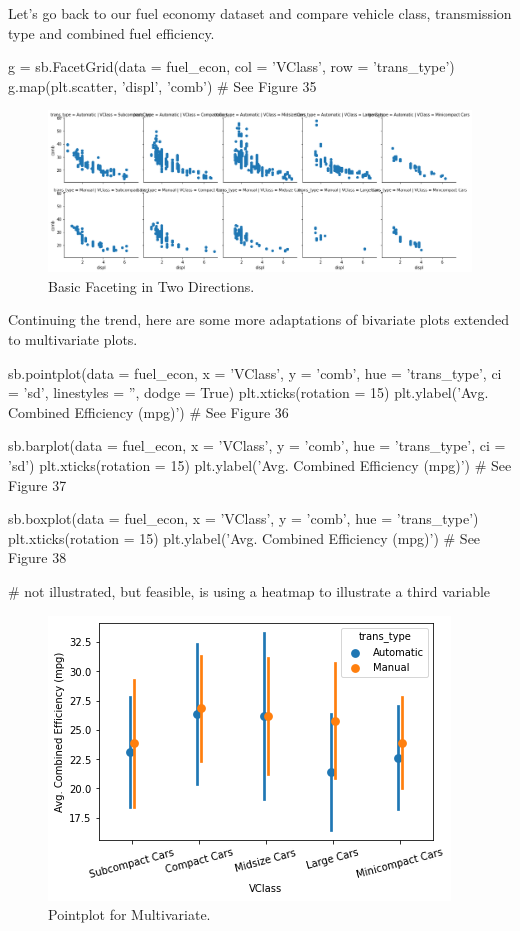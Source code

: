 Let's go back to our fuel economy dataset and compare vehicle class, transmission type and combined fuel efficiency.

\begin{python}
	g = sb.FacetGrid(data = fuel_econ, col = 'VClass', row = 'trans_type')
	g.map(plt.scatter, 'displ', 'comb')
	# See Figure 35
\end{python}

\begin{figure}
	\includegraphics[width=\textwidth,height=\textheight,keepaspectratio]{images/figure35.png}
	\caption{Basic Faceting in Two Directions.}\label{fig:figure35}
\end{figure}

Continuing the trend, here are some more adaptations of bivariate plots extended to multivariate plots.

\begin{python}
	sb.pointplot(data = fuel_econ, x = 'VClass', y = 'comb', hue = 'trans_type', ci = 'sd', linestyles = '', dodge = True)
	plt.xticks(rotation = 15)
	plt.ylabel('Avg. Combined Efficiency (mpg)')
	# See Figure 36
	
	sb.barplot(data = fuel_econ, x = 'VClass', y = 'comb', hue = 'trans_type', ci = 'sd')
	plt.xticks(rotation = 15)
	plt.ylabel('Avg. Combined Efficiency (mpg)')
	# See Figure 37
	
	sb.boxplot(data = fuel_econ, x = 'VClass', y = 'comb', hue = 'trans_type')
	plt.xticks(rotation = 15)
	plt.ylabel('Avg. Combined Efficiency (mpg)')
	# See Figure 38
	
	# not illustrated, but feasible, is using a heatmap to illustrate a third variable
\end{python}

\begin{figure}
	\includegraphics{images/figure36.png}
	\caption{Pointplot for Multivariate.}\label{fig:figure36}
\end{figure}

